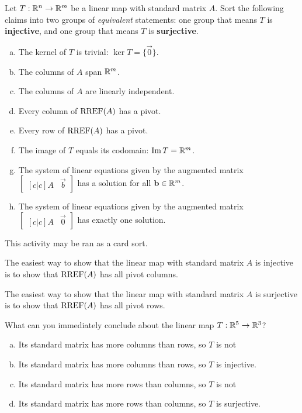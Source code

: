 \begin{applicationActivities}
\begin{activity}{15}
Let $T: \mathbb{R}^n \rightarrow \mathbb{R}^m$ be a linear map with standard matrix $A$.
Sort the following claims into two groups of \textit{equivalent} statements:
one group that means \(T\) is \textbf{injective}, and one group that means
\(T\) is \textbf{surjective}.
\begin{multicols}{2}
\begin{enumerate}[(a)]
\item The kernel of \(T\) is trivial: \(\ker T=\{\vec 0\}\).
\item The columns of $A$ span $\mathbb{R}^m$.
\item The columns of $A$ are linearly independent.
\item Every column of $\operatorname{RREF}(A)$ has a pivot.
\item Every row of $\operatorname{RREF}(A)$ has a pivot.
\item The image of \(T\) equals its codomain: \(\operatorname{Im} T=\mathbb{R}^m\).
\item The system of linear equations given by the augmented matrix $\begin{bmatrix}[c|c]A & \vec{b} \end{bmatrix}$ has a solution for all $\mathbf{b} \in \mathbb{R}^m$.
\item The system of linear equations given by the augmented matrix $\begin{bmatrix}[c|c] A & \vec{0} \end{bmatrix}$ has exactly one solution.
\end{enumerate}
\end{multicols}
\begin{instructorNote}
  This activity may be ran as a card sort.
\end{instructorNote}
\end{activity}

\begin{observation}
  The easiest way to show that the linear map with standard matrix \(A\)
  is injective is to show that \(\operatorname{RREF}(A)\) has all pivot columns.

  \vspace{1em}

  The easiest way to show that the linear map with standard matrix \(A\)
  is surjective is to show that \(\operatorname{RREF}(A)\) has all pivot rows.
\end{observation}

\begin{activity}{3}
  What can you immediately conclude about the linear map \(T:\mathbb{R}^5\to\mathbb{R}^3\)?
  \begin{enumerate}[a)]
    \item Its standard matrix has more columns than rows, so \(T\) is not
    \item Its standard matrix has more columns than rows, so \(T\) is
    injective.
    \item Its standard matrix has more rows than columns, so \(T\) is not
    \item Its standard matrix has more rows than columns, so \(T\) is
    surjective.
  \end{enumerate}
\end{activity}


\end{applicationActivities}
